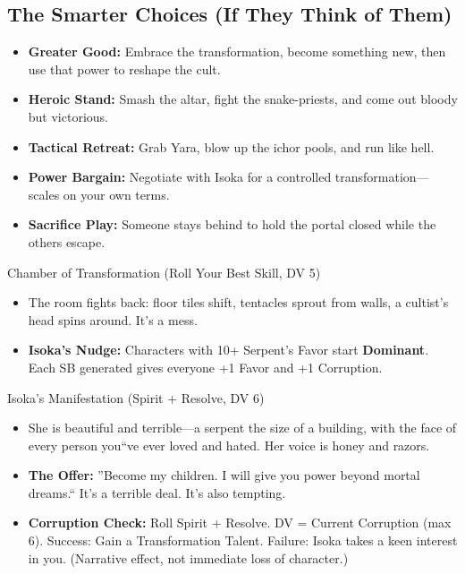 \documentclass[11pt]{article}
\begin{document}
\subsection*{The Smarter Choices (If They Think of Them)}
\begin{itemize}
    \item \textbf{Greater Good:} Embrace the transformation, become something new, then use that power to reshape the cult.
    \item \textbf{Heroic Stand:} Smash the altar, fight the snake-priests, and come out bloody but victorious.
    \item \textbf{Tactical Retreat:} Grab Yara, blow up the ichor pools, and run like hell.
    \item \textbf{Power Bargain:} Negotiate with Isoka for a controlled transformation---scales on your own terms.
    \item \textbf{Sacrifice Play:} Someone stays behind to hold the portal closed while the others escape.
\end{itemize}

\begin{mechanicsbox}{Chamber of Transformation (Roll Your Best Skill, DV 5)}
\begin{itemize}
    \item The room fights back: floor tiles shift, tentacles sprout from walls, a cultist's head spins around. It's a mess.
    \item \textbf{Isoka's Nudge:} Characters with 10+ Serpent's Favor start \textbf{Dominant}. Each SB generated gives everyone +1 Favor and +1 Corruption.
\end{itemize}
\end{mechanicsbox}

\begin{mechanicsbox}{Isoka's Manifestation (Spirit + Resolve, DV 6)}
\begin{itemize}
    \item She is beautiful and terrible---a serpent the size of a building, with the face of every person you``ve ever loved and hated. Her voice is honey and razors.
    \item \textbf{The Offer:} ''Become my children. I will give you power beyond mortal dreams.`` It's a terrible deal. It's also tempting.
    \item \textbf{Corruption Check:} Roll Spirit + Resolve. DV = Current Corruption (max 6). Success: Gain a Transformation Talent. Failure: Isoka takes a keen interest in you. (Narrative effect, not immediate loss of character.)
\end{itemize}
\end{mechanicsbox}
\end{document}
